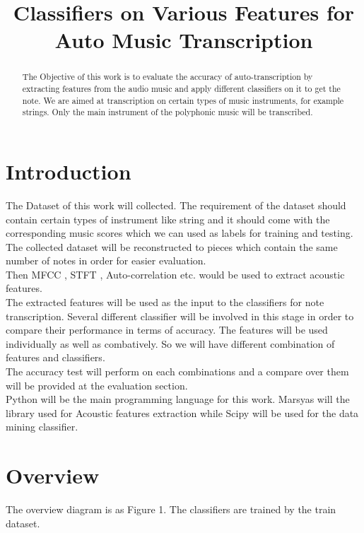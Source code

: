 \documentclass{article}
\title{Classifiers on Various Features for Auto Music Transcription \conferenceyear}
\begin{document}
%
\maketitle
%
\begin{abstract}
The Objective of this work is to evaluate the accuracy of auto-transcription by extracting features from the audio music and apply different classifiers on it to get the note. We are aimed at transcription on certain types of music instruments, for example strings. Only the main instrument of the polyphonic music will be transcribed.
\end{abstract}
%
\section{Introduction}\label{sec:introduction}
The Dataset of this work will collected. The requirement of the dataset should contain certain types of instrument like string and it should come with the corresponding music scores which we can used as labels for training and testing. The collected dataset will be reconstructed to pieces which contain the same number of notes in order for easier evaluation.\\
Then MFCC , STFT , Auto-correlation etc. would be used to extract acoustic features.\\
The extracted features will be used as the input to the classifiers for note transcription. Several different classifier will be involved in this stage in order to compare their performance in terms of accuracy. The features will be used individually as well as combatively. So we will have different combination of features and classifiers.\\
The accuracy test will perform on each combinations and a compare over them will be provided at the evaluation section.\\
Python will be the main programming language for this work. Marsyas will the library used for Acoustic features extraction while Scipy  will be used for the data mining classifier. 


\section{Overview}
The overview diagram is as Figure 1. The classifiers are trained by the train dataset.
\end{document}
